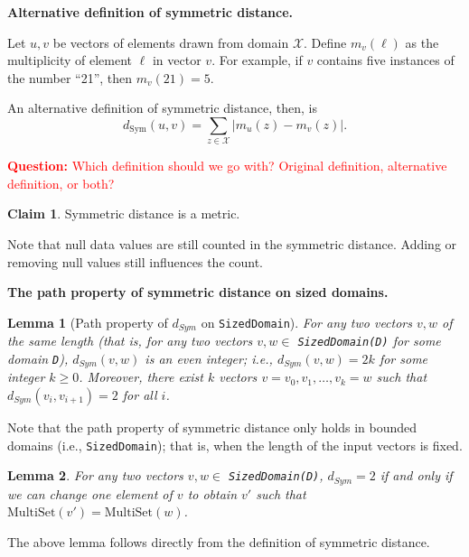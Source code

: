 \documentclass[11pt,a4paper]{article}
\newtheorem{lemma}{Lemma}
\theoremstyle{definition}
\newtheorem{claim}{Claim}
\newcommand{\MultiSet}{\mathrm{MultiSet}}
\newcommand{\dout}{d_{out}}
\newcommand{\questionc}[1]{\textcolor{red}{\textbf{Question:} #1}}
\newcommand{\grace}[1]{{ {\color{purple}{(grace)~#1}}}}
\begin{document}
\medskip
\textbf{Alternative definition of symmetric distance.}

Let $u,v$ be vectors of elements drawn from domain $\mathcal{X}$. Define $m_v(\ell)$ as the multiplicity of element $\ell$ in vector $v$. For example, if $v$ contains five instances of the number ``21'', then $m_v(21) = 5$.

An alternative definition of symmetric distance, then, is $$d_{\text{Sym}}(u,v) = \sum_{z\in \mathcal{X}} |m_u(z) - m_v(z)|.$$

\questionc{Which definition should we go with? Original definition, alternative definition, or both?}

\begin{claim}
Symmetric distance is a metric.
\end{claim}

Note that null data values are still counted in the symmetric distance. Adding or removing null values still influences the count.

\medskip
\textbf{The path property of symmetric distance on sized domains.}

\begin{lemma}[Path property of $d_{Sym}$ on \texttt{SizedDomain}]
    For any two vectors $v, w$ of the same length (that is, for any two vectors $v, w \in$ \texttt{SizedDomain(D)} for some domain \texttt{D}), $d_{Sym}(v,w)$ is an even integer; i.e., $d_{Sym}(v,w) = 2k$ for some integer $k \geq 0$. Moreover, there exist $k$ vectors $v=v_0, v_1, \ldots, v_k=w$ such that $d_{Sym}(v_i,v_{i+1})=2$ for all $i$.
\end{lemma}


Note that the path property of symmetric distance only holds in bounded domains (i.e., \texttt{SizedDomain}); that is, when the length of the input vectors is fixed.

\begin{lemma}
    For any two vectors $v, w \in$ \texttt{SizedDomain(D)}, $d_{Sym} = 2$ if and only if we can change one element of $v$ to obtain $v'$ such that $\MultiSet(v') = \MultiSet(w)$.
\end{lemma}

The above lemma follows directly from the definition of symmetric distance. 

\end{document}
